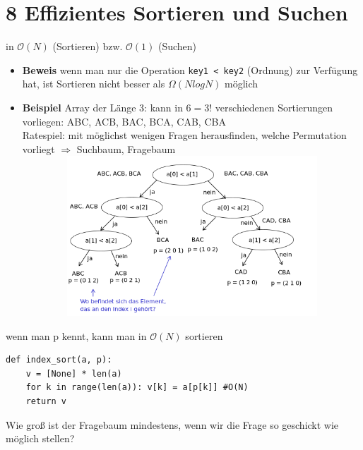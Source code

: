 \documentclass[11pt, fleqn]{scrreprt}
\newcommand{\bigO}[0]{\mathcal{O}}
\begin{document}
\chapter*{8 Effizientes Sortieren und Suchen}
in $\bigO{}(N)$ (Sortieren) bzw. $\bigO{}(1)$ (Suchen) \\
\begin{itemize}[label={}]
    \item \textbf{Beweis} wenn man nur die Operation \verb|key1 < key2| (Ordnung) zur Verfügung hat, ist Sortieren nicht besser als $\Omega (NlogN)$ möglich
    \item \textbf{Beispiel} Array der Länge 3: kann in $ 6 = 3!$ verschiedenen Sortierungen vorliegen: ABC, ACB, BAC, BCA, CAB, CBA \\
    Ratespiel: mit möglichst wenigen Fragen herausfinden, welche Permutation vorliegt $\Rightarrow$ Suchbaum, Fragebaum \\
    \includegraphics[width=16cm,height=6cm,keepaspectratio]{./Pictures/Fragebaum.png}
\end{itemize}
wenn man p kennt, kann man in $\bigO{}(N)$ sortieren
\begin{verbatim}
def index_sort(a, p):
    v = [None] * len(a)
    for k in range(len(a)): v[k] = a[p[k]] #O(N)
    return v
\end{verbatim}
\vspace*{0.5cm}
Wie groß ist der Fragebaum mindestens, wenn wir die Frage so geschickt wie möglich stellen?
\end{document}
